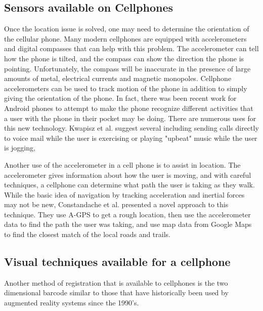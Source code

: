 \documentclass{acm_proc_article-sp}
\begin{document}
\subsection{Sensors available on Cellphones}

Once the location issue is solved, one may need to determine the orientation of the cellular phone. Many modern cellphones are equipped with  accelerometers and digital compasses that can help with this problem.  The accelerometer can tell how the phone is tilted, and the compass can show the direction the phone is pointing.  Unfortunately, the compass will be inaccurate in the presence of large amounts of metal, electrical currents \cite{karpischek2009swisspeaks} and magnetic monopoles.  Cellphone accelerometers can be used to track motion of the phone in addition to simply giving the orientation of the phone.  In fact, there was been recent work for Android phones to attempt to make the phone recognize different activities that a user with the phone in their pocket may be doing.  \cite{kwapisz2010activity}  There are numerous uses for this new technology.  Kwapisz et al. suggest several including sending calls directly to voice mail while the user is exercising or playing "upbeat" music while the user is jogging,

Another use of the accelerometer in a cell phone is to assist in location.  The accelerometer gives information about how the user is moving, and with careful techniques, a cellphone can determine what path the user is taking as they walk. While the basic idea of navigation by tracking acceleration and inertial forces may not be new, \cite{farrell1999global} \cite{gustafsson2002particle} Constandache et al. presented a novel approach to this technique. They use A-GPS to get a rough location, then use the accelerometer data to find the path the user was taking, and use map data from Google Maps to find the closest match of the local roads and trails.   \cite{constandache2010towards}

\subsection{Visual techniques available for a cellphone}

Another method of registration that is available to cellphones is the two dimensional barcode similar to those that have historically been used by augmented reality systems since the 1990's.
\end{document}
